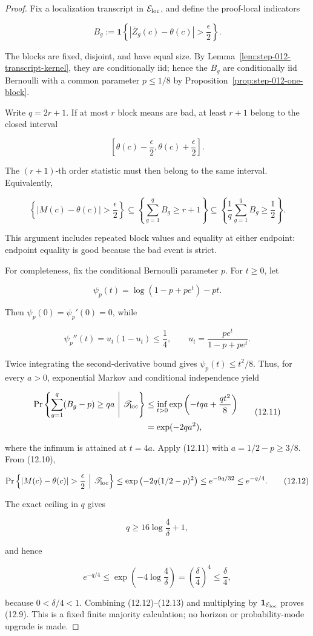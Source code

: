 \begin{proof}
Fix a localization transcript in
\(\mathcal E_{\rm loc}\), and define the proof-local indicators

\[
B_g
:=\mathbf1\left\{
|\overline Z_g(c)-\theta(c)|>\frac{\epsilon}{2}
\right\}.
\]

The blocks are fixed, disjoint, and have equal size. By
Lemma~\ref{lem:step-012-transcript-kernel}, they are conditionally iid;
hence the \(B_g\) are conditionally iid Bernoulli with a common parameter
\(p\leq1/8\) by Proposition~\ref{prop:step-012-one-block}.

Write \(q=2r+1\). If at most \(r\) block means are bad, at least \(r+1\)
belong to the closed interval

\[
\left[\theta(c)-\frac{\epsilon}{2},
\theta(c)+\frac{\epsilon}{2}\right].
\]

The \((r+1)\)-th order statistic must then belong to the same interval.
Equivalently,

\[
\left\{|M(c)-\theta(c)|>\frac{\epsilon}{2}\right\}
\subseteq
\left\{\sum_{g=1}^qB_g\geq r+1\right\}
\subseteq
\left\{\frac1q\sum_{g=1}^qB_g\geq\frac12\right\}.
\tag{12.10}
\]

This argument includes repeated block values and equality at either endpoint:
endpoint equality is good because the bad event is strict.

For completeness, fix the conditional Bernoulli parameter \(p\). For
\(t\geq0\), let

\[
\psi_p(t)=\log(1-p+pe^t)-pt.
\]

Then \(\psi_p(0)=\psi_p'(0)=0\), while

\[
\psi_p''(t)=u_t(1-u_t)\leq\frac14,
\qquad
u_t=\frac{pe^t}{1-p+pe^t}.
\]

Twice integrating the second-derivative bound gives
\(\psi_p(t)\leq t^2/8\). Thus, for every \(a>0\), exponential Markov and
conditional independence yield

\[
\begin{aligned}
\Pr\left\{\sum_{g=1}^q(B_g-p)\geq qa
\ \middle|\ \mathscr T_{\rm loc}\right\}
&\leq
\inf_{t>0}\exp\left(-tqa+\frac{qt^2}{8}\right)\\
&=\exp(-2qa^2),
\end{aligned}
\tag{12.11}
\]

where the infimum is attained at \(t=4a\). Apply (12.11) with
\(a=1/2-p\geq3/8\). From (12.10),

\[
\Pr\left\{|M(c)-\theta(c)|>\frac{\epsilon}{2}
\ \middle|\ \mathscr T_{\rm loc}\right\}
\leq
\exp\left(-2q(1/2-p)^2\right)
\leq e^{-9q/32}
\leq e^{-q/4}.
\tag{12.12}
\]

The exact ceiling in \(q\) gives

\[
q\geq16\log\frac4\delta+1,
\]

and hence

\[
e^{-q/4}
\leq
\exp\left(-4\log\frac4\delta\right)
=\left(\frac{\delta}{4}\right)^4
\leq\frac{\delta}{4},
\tag{12.13}
\]

because \(0<\delta/4<1\). Combining (12.12)--(12.13) and multiplying by
\(\mathbf1_{\mathcal E_{\rm loc}}\) proves (12.9). This is a fixed finite
majority calculation; no horizon or probability-mode upgrade is made.
\end{proof}

